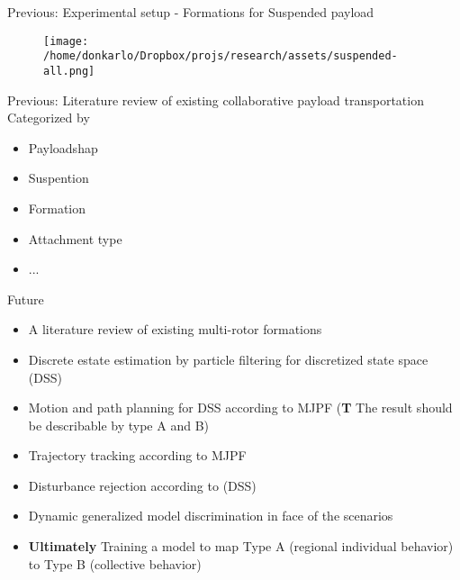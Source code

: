 \documentclass[unknownkeysallowed]{beamer}
\begin{document}
	\begin{frame}{Previous: Experimental setup - Formations for Suspended payload}
		\begin{figure}
			\texttt{[image: /home/donkarlo/Dropbox/projs/research/assets/suspended-all.png]}
			\caption{}
		\end{figure}
	\end{frame}

	\begin{frame}{Previous: Literature review of existing collaborative payload transportation}
		Categorized by
		\begin{itemize}
			\item Payloadshap
			\item Suspention
			\item Formation
			\item  Attachment type
			\item  ...
		\end{itemize}
	\end{frame}

	\begin{frame}{Future}
		\begin{itemize}
			\item A literature review of existing multi-rotor formations
			\item Discrete estate estimation by particle filtering for discretized state space (DSS)
			\item Motion and path planning for DSS according to MJPF (\textbf{T} The result should be describable by type A and B)
			\item Trajectory tracking according to MJPF
			\item Disturbance rejection according to (DSS)
			\item Dynamic generalized model discrimination in face of the scenarios
			\item \textbf{Ultimately} Training a model to map Type A (regional individual behavior) to Type B (collective behavior)
		\end{itemize}
	\end{frame}
\end{document}
